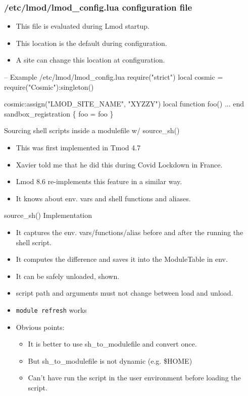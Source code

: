 \documentclass{beamer}
\begin{document}
\begin{frame}[fragile]
  \frametitle{/etc/lmod/lmod\_config.lua configuration file}
  \begin{itemize}
    \item This file is evaluated during Lmod startup. 
    \item This location is the default during configuration.
    \item A site can change this location at configuration.
  \end{itemize}
    {\small
\begin{semiverbatim}
-- Example /etc/lmod/lmod\_config.lua
require("strict")
local cosmic = require("Cosmic"):singleton()

cosmic:assign("LMOD\_SITE\_NAME", "XYZZY")
local function foo()
  ...
end
sandbox\_registration \{ foo = foo \}
\end{semiverbatim}
}
\end{frame}

\begin{frame}{Sourcing shell scripts inside a modulefile w/ source\_sh()}
  \begin{itemize}
    \item This was first implemented in Tmod 4.7
    \item Xavier told me that he did this during Covid Lockdown in France.
    \item Lmod 8.6 re-implements this feature in a similar way.
    \item It knows about env. vars and shell functions and aliases.
  \end{itemize}
\end{frame}

\begin{frame}{source\_sh() Implementation}
  \begin{itemize}
    \item It captures the env. vars/functions/alias before and after
      the running the shell script.
    \item It computes the difference and saves it into the ModuleTable
      in env.
    \item It can be safely unloaded, shown.
    \item script path and arguments must not change between load and unload.
    \item \texttt{module refresh} works
    \item Obvious points:
      \begin{itemize}
        \item It is better to use sh\_to\_modulefile and convert once.
        \item But sh\_to\_modulefile is not dynamic (e.g. \$HOME)
        \item Can't have run the script in the user environment before
          loading the script.
      \end{itemize}
  \end{itemize}
\end{frame}
\end{document}
